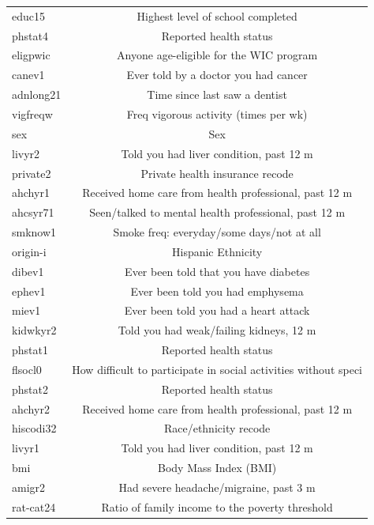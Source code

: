 \documentclass[reqno,11pt]{article}
\begin{document}
\begin{table}[h!]
\begin{tabular}{|| l | c ||}
educ15         & Highest level of school completed \\ [0.5ex] 
phstat4        & Reported health status \\ [0.5ex] 
eligpwic        & Anyone age-eligible for the WIC program \\ [0.5ex] 
canev1        & Ever told by a doctor you had cancer \\ [0.5ex] 
adnlong21   & Time since last saw a dentist \\ [0.5ex] 
vigfreqw      & Freq vigorous activity (times per wk) \\ [0.5ex] 
sex              & Sex \\ [0.5ex] 
livyr2           & Told you had liver condition, past 12 m \\ [0.5ex] 
private2      & Private health insurance recode \\ [0.5ex] 
ahchyr1      & Received home care from health professional, past 12 m \\ [0.5ex] 
ahcsyr71     & Seen/talked to mental health professional, past 12 m \\ [0.5ex] 
smknow1     & Smoke freq: everyday/some days/not at all \\ [0.5ex] 
origin-i         & Hispanic Ethnicity \\ [0.5ex] 
dibev1         & Ever been told that you have diabetes \\ [0.5ex] 
ephev1       & Ever been told you had emphysema \\ [0.5ex] 
miev1          & Ever been told you had a heart attack \\ [0.5ex] 
kidwkyr2     & Told you had weak/failing kidneys, 12 m \\ [0.5ex] 
phstat1      & Reported health status \\ [0.5ex] 
flsocl0        & How difficult to participate in social activities without speci \\ [0.5ex] 
phstat2      & Reported health status \\ [0.5ex] 
ahchyr2     & Received home care from health professional, past 12 m \\ [0.5ex] 
hiscodi32   & Race/ethnicity recode \\ [0.5ex] 
livyr1         & Told you had liver condition, past 12 m \\ [0.5ex] 
bmi            & Body Mass Index (BMI) \\ [0.5ex] 
amigr2       & Had severe headache/migraine, past 3 m \\ [0.5ex] 
rat-cat24  & Ratio of family income to the poverty threshold \\ [0.5ex] 

\end{tabular}
\end{table}
\end{document}
